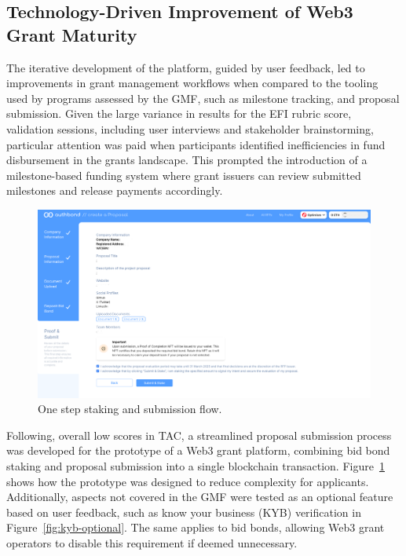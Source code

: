 \documentclass[conference]{IEEEtran}
\begin{document}
\subsection{Technology-Driven Improvement of Web3 Grant Maturity}\label{sec_4.3}

The iterative development of the platform, guided by user feedback, led to improvements in grant management workflows when compared to the tooling used by programs assessed by the GMF, such as milestone tracking, and proposal submission. Given the large variance in results for the EFI rubric score, validation sessions, including user interviews and stakeholder brainstorming, particular attention was paid when participants identified inefficiencies in fund disbursement in the grants landscape. This prompted the introduction of a milestone-based funding system where grant issuers can review submitted milestones and release payments accordingly.

\begin{figure}[htbp]
\centerline{\includegraphics[scale=0.1]{auth-stake-submit.png}}
\caption{One step staking and submission flow.}
\label{fig:stake-submit}
\end{figure}

Following, overall low scores in TAC, a streamlined proposal submission process was developed for the prototype of a Web3 grant platform, combining bid bond staking and proposal submission into a single blockchain transaction. Figure~\ref{fig:stake-submit} shows how the prototype was designed to reduce complexity for applicants. Additionally, aspects not covered in the GMF were tested as an optional feature based on user feedback, such as know your business (KYB) verification in Figure~\ref{fig:kyb-optional}. The same applies to bid bonds, allowing Web3 grant operators to disable this requirement if deemed unnecessary.
\end{document}
